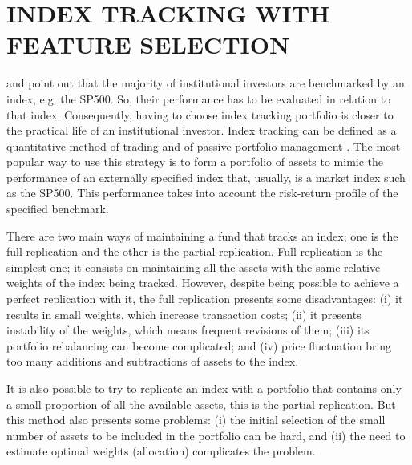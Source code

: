 \documentclass[12pt,oneside,a4paper]{memoir}
\begin{document}

\chapter{INDEX TRACKING WITH FEATURE SELECTION}


 and  point out that the majority of institutional investors are benchmarked by an index, e.g. the SP500.
So, their performance has to be evaluated in relation to that index.
Consequently, having to choose index tracking portfolio is closer to the practical life of an institutional investor.
Index tracking can be defined as a quantitative method of trading and of passive portfolio management \cite{PLS10, nnl14}.
The most popular way to use this strategy is to form a portfolio of assets to mimic the performance of an externally specified index that, usually, is a market index such as the SP500.
This performance takes into account the risk-return profile of the specified benchmark.

There are two main ways of maintaining a fund that tracks an index; one is the full replication and the other is the partial replication.
Full replication is the simplest one; it consists on maintaining all the assets with the same relative weights of the index being tracked.
However, despite being possible to achieve a perfect replication with it, the full replication presents some disadvantages:
(i) it results in small weights, which increase transaction costs;
(ii) it presents instability of the weights, which means frequent revisions of them;
(iii) its portfolio rebalancing can become complicated; 
and (iv) price fluctuation bring too many additions and subtractions of assets to the index.

It is also possible to try to replicate an index with a portfolio that contains only a small proportion of all the available assets, this is the partial replication.
But this method also presents some problems:
(i) the initial selection of the small number of assets to be included in the portfolio can be hard, and
(ii) the need to estimate optimal weights (allocation) complicates the problem.
\end{document}
